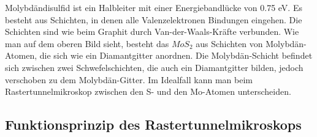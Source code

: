 Molybdändisulfid ist ein Halbleiter mit einer Energiebandlücke von 0.75 eV. Es besteht aus Schichten, in denen alle Valenzelektronen Bindungen eingehen. Die Schichten sind wie beim Graphit durch Van-der-Waals-Kräfte verbunden. Wie man auf dem oberen Bild sieht, besteht das $MoS_2$ aus Schichten von Molybdän-Atomen, die sich wie ein Diamantgitter anordnen. Die Molybdän-Schicht befindet sich zwischen zwei Schwefelschichten, die auch ein Diamantgitter bilden, jedoch verschoben zu dem Molybdän-Gitter. Im Idealfall kann man beim Rastertunnelmikroskop zwischen den S- und den Mo-Atomen unterscheiden.































\subsection{Funktionsprinzip des Rastertunnelmikroskops}
